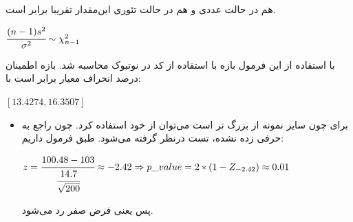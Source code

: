 \documentclass[a4paper,14pt]{extarticle}
\begin{document}
هم در حالت عددی و هم در حالت تئوری این‌مقدار تقریبا برابر است.
\begin{latin}
	$
	\cfrac{(n - 1) s^2}{\sigma^2} \sim \chi_{n - 1}^2
	$
\end{latin}
با استفاده از این فرمول بازه با استفاده از کد در نوتبوک محاسبه شد. بازه اطمینان 
درصد انحراف معیار برابر است با:
\begin{latin}
	$
	[13.4274, 16.3507]
	$
\end{latin}
\begin{itemize}
	\item 
	برای  چون سایز نمونه از 
	بزرگ تر است می‌توان از خود استفاده کرد. چون راجع به  حرفی زده نشده، تست 
	درنظر گرفته می‌شود.
	طبق فرمول داریم:
	\begin{latin}
		$
		z = \cfrac{100.48 - 103}{\cfrac{14.7}{\sqrt{200}}} \approx -2.42
		\Rightarrow p\_value = 2*(1 - Z_{-2.42}) \approx 0.01
		$
	\end{latin}
	پس یعنی فرض صفر رد می‌شود. 
\end{itemize}
\end{document}
